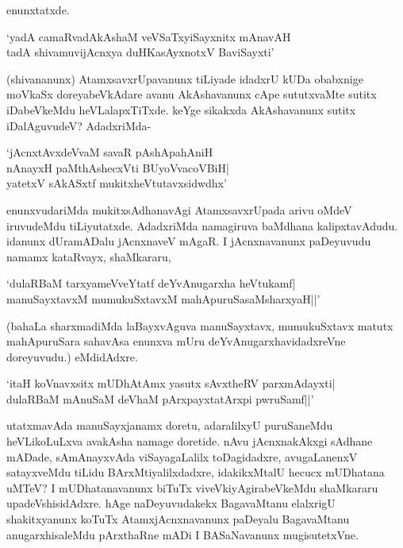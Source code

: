 enunxtatxde.

\begin{shloka}
`yadA camaRvadAkAshaM veVSaTxyiSayxnitx mAnavAH\\
tadA shivamuvijAcnxya duHKasAyxnotxV BaviSayxti'
\end{shloka}

(shivananunx) AtamxsavxrUpavanunx tiLiyade idadxrU kUDa obabxnige moVkaSx doreyabeVkAdare avanu AkAshavanunx cApe sututxvaMte sutitx iDabeVkeMdu heVLalapxTiTxde. keYge sikakxda AkAshavanunx sutitx iDalAguvudeV? AdadxriMda-

\begin{shloka}
`jAcnxtAvxdeVvaM savaR pAshApahAniH\\
nAnayxH paMthAshecxVti BUyoVvacoVBiH|\\
yatetxV sAkASxtf mukitxheVtutavxsidwdhx'
\end{shloka}

enunxvudariMda mukitxsAdhanavAgi AtamxsavxrUpada arivu oMdeV iruvudeMdu tiLiyutatxde. AdadxriMda namagiruva baMdhana kalipxtavAdudu. idanunx dUramADalu jAcnxnaveV mAgaR. I jAcnxnavanunx paDeyuvudu namamx kataRvayx, shaMkararu,

\begin{shloka}
`dulaRBaM tarxyameVveYtatf deYvAnugarxha heVtukamf|\\
manuSayxtavxM mumukuSxtavxM mahApuruSasaMsharxyaH||'
\end{shloka}

(bahaLa sharxmadiMda laBayxvAguva manuSayxtavx, mumukuSxtavx matutx mahApuruSara sahavAsa enunxva mUru deYvAnugarxhavidadxreVne doreyuvudu.) eMdidAdxre.

\begin{shloka}
`itaH koVnavxsitx mUDhAtAmx yasutx sAvxtheRV parxmAdayxti|\\
dulaRBaM mAnuSaM deVhaM pArxpayxtatArxpi pwruSamf||'
\end{shloka}

utatxmavAda manuSayxjanamx doretu, adaralilxyU puruSaneMdu heVLikoLuLxva avakAsha namage doretide. nAvu jAcnxnakAkxgi sAdhane mADade, sAmAnayxvAda viSayagaLalilx toDagidadxre, avugaLanenxV satayxveMdu tiLidu BArxMtiyalilxdadxre, idakikxMtalU hecucx mUDhatana uMTeV? I mUDhatanavanunx biTuTx viveVkiyAgirabeVkeMdu shaMkararu upadeVshisidAdxre. hAge naDeyuvudakekx BagavaMtanu elalxrigU shakitxyanunx koTuTx AtamxjAcnxnavanunx paDeyalu BagavaMtanu anugarxhisaleMdu pArxthaRne mADi I BASaNavanunx mugisutetxVne.


\endchapter
